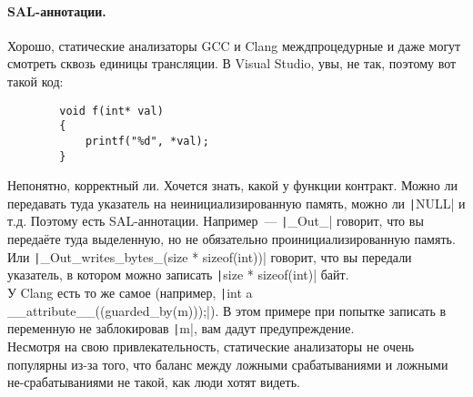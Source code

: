 \documentclass{article}
\begin{document}
    \paragraph{SAL-аннотации.}
    Хорошо, статические анализаторы GCC и Clang междпроцедурные и даже могут смотреть сквозь единицы трансляции. В Visual Studio, увы, не так, поэтому вот такой код:
    \begin{verbatim}
        void f(int* val)
        {
            printf("%d", *val);
        }
    \end{verbatim}
    Непонятно, корректный ли. Хочется знать, какой у функции контракт. Можно ли передавать туда указатель на неинициализированную память, можно ли \texttt|NULL| и т.д. Поэтому есть SAL-аннотации. Например~--- \texttt|_Out_| говорит, что вы передаёте туда выделенную, но не обязательно проинициализированную память. Или \texttt|_Out_writes_bytes_(size * sizeof(int))| говорит, что вы передали указатель, в котором можно записать \texttt|size * sizeof(int)| байт.\\
    У Clang есть то же самое (например, \texttt|int a __attribute__((guarded_by(m)));|). В этом примере при попытке записать в переменную не заблокировав \texttt|m|, вам дадут предупреждение.\\
    Несмотря на свою привлекательность, статические анализаторы не очень популярны из-за того, что баланс между ложными срабатываниями и ложными не-срабатываниями не такой, как люди хотят видеть.
\end{document}

